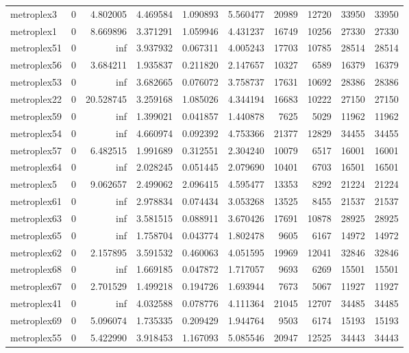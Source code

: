 \begin{longtable}{|l|r|r|r|r|r|r|r|r|r|}
metroplex3 & 0 & 4.802005 & 4.469584 & 1.090893 & 5.560477 & 20989 & 12720 & 33950 & 33950 \\
metroplex1 & 0 & 8.669896 & 3.371291 & 1.059946 & 4.431237 & 16749 & 10256 & 27330 & 27330 \\
metroplex51 & 0 & inf & 3.937932 & 0.067311 & 4.005243 & 17703 & 10785 & 28514 & 28514 \\
metroplex56 & 0 & 3.684211 & 1.935837 & 0.211820 & 2.147657 & 10327 & 6589 & 16379 & 16379 \\
metroplex53 & 0 & inf & 3.682665 & 0.076072 & 3.758737 & 17631 & 10692 & 28386 & 28386 \\
metroplex22 & 0 & 20.528745 & 3.259168 & 1.085026 & 4.344194 & 16683 & 10222 & 27150 & 27150 \\
metroplex59 & 0 & inf & 1.399021 & 0.041857 & 1.440878 & 7625 & 5029 & 11962 & 11962 \\
metroplex54 & 0 & inf & 4.660974 & 0.092392 & 4.753366 & 21377 & 12829 & 34455 & 34455 \\
metroplex57 & 0 & 6.482515 & 1.991689 & 0.312551 & 2.304240 & 10079 & 6517 & 16001 & 16001 \\
metroplex64 & 0 & inf & 2.028245 & 0.051445 & 2.079690 & 10401 & 6703 & 16501 & 16501 \\
metroplex5 & 0 & 9.062657 & 2.499062 & 2.096415 & 4.595477 & 13353 & 8292 & 21224 & 21224 \\
metroplex61 & 0 & inf & 2.978834 & 0.074434 & 3.053268 & 13525 & 8455 & 21537 & 21537 \\
metroplex63 & 0 & inf & 3.581515 & 0.088911 & 3.670426 & 17691 & 10878 & 28925 & 28925 \\
metroplex65 & 0 & inf & 1.758704 & 0.043774 & 1.802478 & 9605 & 6167 & 14972 & 14972 \\
metroplex62 & 0 & 2.157895 & 3.591532 & 0.460063 & 4.051595 & 19969 & 12041 & 32846 & 32846 \\
metroplex68 & 0 & inf & 1.669185 & 0.047872 & 1.717057 & 9693 & 6269 & 15501 & 15501 \\
metroplex67 & 0 & 2.701529 & 1.499218 & 0.194726 & 1.693944 & 7673 & 5067 & 11927 & 11927 \\
metroplex41 & 0 & inf & 4.032588 & 0.078776 & 4.111364 & 21045 & 12707 & 34485 & 34485 \\
metroplex69 & 0 & 5.096074 & 1.735335 & 0.209429 & 1.944764 & 9503 & 6174 & 15193 & 15193 \\
metroplex55 & 0 & 5.422990 & 3.918453 & 1.167093 & 5.085546 & 20947 & 12525 & 34443 & 34443 \\

\end{longtable}
